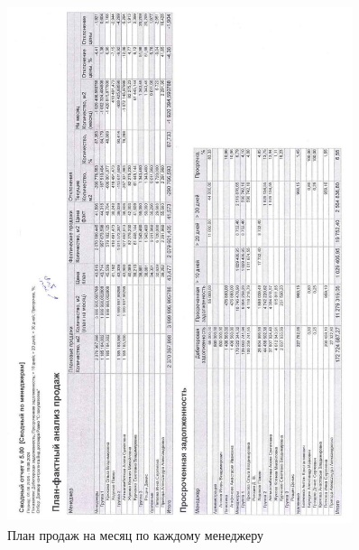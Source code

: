 %
\begin{figure}
\begin{center}
 \includegraphics[height=0.94\textheight, width=0.9\textwidth,  keepaspectratio]{Pics/d01.jpg}
\end{center}
 \caption{План продаж на месяц по каждому менеджеру}
 \label{pic:d1}
\end{figure}
\clearpage



